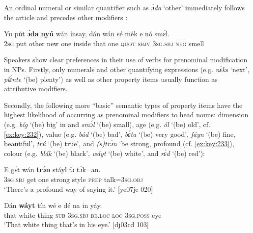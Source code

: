 An ordinal numeral or similar quantifier such as \textit{ɔ́da} ‘other’ immediately follows the article and precedes other modifiers :


\ea%
    \label{ex:key:232}
    \gll Yu  pút  \textbf{ɔ́da}    \textbf{nyú}    wán    ínsay,  dán    wán    sé
mék    e    nó  smɛ́l.\\
\textsc{2sg}  put  other  new    one    inside  that    one    \textsc{quot}
\textsc{sbjv}    \textsc{3sg.sbj}  \textsc{neg}  smell\\

\glt 
{} 
\z

Speakers show clear preferences in their use of verbs for prenominal modification in NPs. Firstly, only numerals and other quantifying expressions (e.g. \textit{nɛ́ks} ‘next’, \textit{plɛ́nte} ‘(be) plenty’) as well as other property items usually function as attributive modifiers. 


Secondly, the following more “basic” semantic types of property items have the highest likelihood of occurring as prenominal modifiers to head nouns: dimension (e.g. \textit{bíg} ‘(be) big’ in  and \textit{smɔ́l} ‘(be) small), age (e.g. \textit{ól} ‘(be) old’, cf. \ref{ex:key:232}), value (e.g. \textit{bád} ‘(be) bad’, \textit{bɛ́ta} ‘(be) very good’, \textit{fáyn} ‘(be) fine, beautiful’, \textit{trú} ‘(be) true’, and \textit{(s)trɔ́n} ‘be strong, profound (cf. \ref{ex:key:233}), colour (e.g. \textit{blák} ‘(be) black’, \textit{wáyt} ‘(be) white’, and \textit{rɛ́d} ‘(be) red’):



\ea%
    \label{ex:key:233}
    \gll E    gɛ́t  wán  \textbf{trɔ́n}    stáyl  fɔ  tɔ́k=an.\\
\textsc{3sg.sbj}  get  one  strong  style  \textsc{prep}  talk=\textsc{3sg.obj}\\

\glt ‘There’s a profound way of saying it.’ [ye07je 020]
\z


\ea%
    \label{ex:key:234}
    \gll Dán  \textbf{wáyt}  tín    wé  e    dé    na  in    yáy.\\
that  white  thing  \textsc{sub}  \textsc{3sg.sbj}  \textsc{be.loc}  \textsc{loc}  \textsc{3sg.poss}  eye\\

\glt ‘That white thing that’s in his eye.’ [dj03cd 103]
\z

